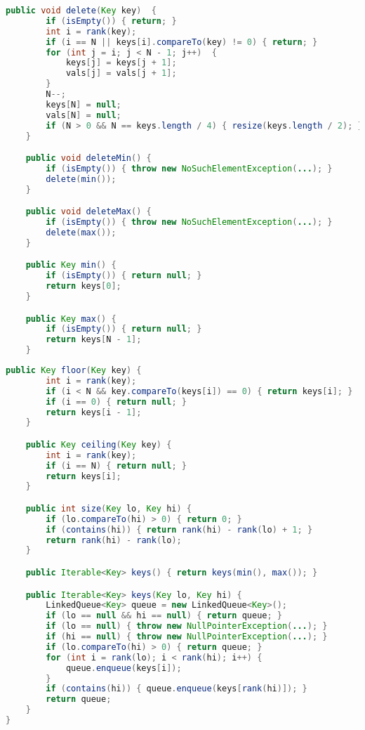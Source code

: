 \documentclass[8pt,a4paper,compress]{beamer}
\begin{document}
\begin{frame}[fragile]
\begin{lstlisting}[language=Java]
    public void delete(Key key)  {
        if (isEmpty()) { return; }
        int i = rank(key);
        if (i == N || keys[i].compareTo(key) != 0) { return; }
        for (int j = i; j < N - 1; j++)  {
            keys[j] = keys[j + 1];
            vals[j] = vals[j + 1];
        }
        N--;
        keys[N] = null; 
        vals[N] = null;
        if (N > 0 && N == keys.length / 4) { resize(keys.length / 2); }
    } 

    public void deleteMin() {
        if (isEmpty()) { throw new NoSuchElementException(...); }
        delete(min());
    }

    public void deleteMax() {
        if (isEmpty()) { throw new NoSuchElementException(...); }
        delete(max());
    }

    public Key min() {
        if (isEmpty()) { return null; }
        return keys[0]; 
    }

    public Key max() {
        if (isEmpty()) { return null; }
        return keys[N - 1];
    }
\end{lstlisting}
\end{frame}

\begin{frame}[fragile]
\begin{lstlisting}[language=Java]
    public Key floor(Key key) {
        int i = rank(key);
        if (i < N && key.compareTo(keys[i]) == 0) { return keys[i]; }
        if (i == 0) { return null; }
        return keys[i - 1];
    }

    public Key ceiling(Key key) {
        int i = rank(key);
        if (i == N) { return null; }
        return keys[i];
    }

    public int size(Key lo, Key hi) {
        if (lo.compareTo(hi) > 0) { return 0; }
        if (contains(hi)) { return rank(hi) - rank(lo) + 1; }
        return rank(hi) - rank(lo);
    }

    public Iterable<Key> keys() { return keys(min(), max()); }

    public Iterable<Key> keys(Key lo, Key hi) {
        LinkedQueue<Key> queue = new LinkedQueue<Key>(); 
        if (lo == null && hi == null) { return queue; }
        if (lo == null) { throw new NullPointerException(...); }
        if (hi == null) { throw new NullPointerException(...); }
        if (lo.compareTo(hi) > 0) { return queue; }
        for (int i = rank(lo); i < rank(hi); i++) {
            queue.enqueue(keys[i]);
        }
        if (contains(hi)) { queue.enqueue(keys[rank(hi)]); }
        return queue; 
    }    
}
\end{lstlisting}
\end{frame}
\end{document}
